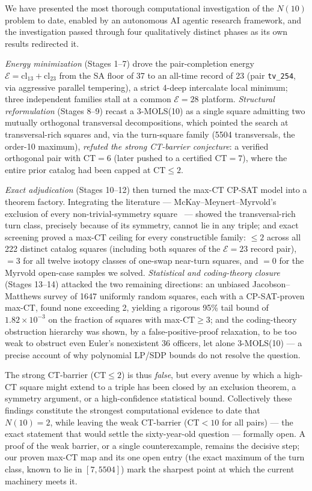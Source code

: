 \documentclass[11pt,a4paper]{article}
\theoremstyle{remark}
\newcommand{\CT}{\mathrm{CT}}
\newcommand{\cl}{\mathrm{cl}}
\newcommand{\E}{\mathcal{E}}
\begin{document}
We have presented the most thorough computational investigation of the $N(10)$
problem to date, enabled by an autonomous AI agentic research framework, and the
investigation passed through four qualitatively distinct phases as its own results
redirected it.

\emph{Energy minimization} (Stages 1--7) drove the pair-completion energy
$\E = \cl_{13} + \cl_{23}$ from the SA floor of 37 to an all-time record of 23 (pair
\texttt{tv\_254}, via aggressive parallel tempering), a strict 4-deep intercalate
local minimum; three independent families stall at a common $\E=28$ platform.
\emph{Structural reformulation} (Stages 8--9) recast a 3-MOLS(10) as a single square
admitting two mutually orthogonal transversal decompositions, which pointed the search
at transversal-rich squares and, via the turn-square family (5504 transversals, the
order-10 maximum), \emph{refuted the strong CT-barrier conjecture}: a verified
orthogonal pair with $\CT = 6$ (later pushed to a certified $\CT = 7$), where the entire
prior catalog had been capped at $\CT \leq 2$.

\emph{Exact adjudication} (Stages 10--12) then turned the max-$\CT$ CP-SAT model into a
theorem factory. Integrating the literature --- McKay--Meynert--Myrvold's exclusion of
every non-trivial-symmetry square~\cite{mmm2007} --- showed the transversal-rich turn
class, precisely because of its symmetry, cannot lie in any triple; and exact screening
proved a max-$\CT$ ceiling for every constructible family: $\leq 2$ across all 222
distinct catalog squares (including both squares of the $\E=23$ record pair), $=3$ for
all twelve isotopy classes of one-swap near-turn squares, and $=0$ for the Myrvold
open-case samples we solved. \emph{Statistical and coding-theory closure} (Stages
13--14) attacked the two remaining directions: an unbiased Jacobson--Matthews survey of
1647 uniformly random squares, each with a CP-SAT-proven max-$\CT$, found none exceeding
2, yielding a rigorous 95\% tail bound of $1.82\times10^{-3}$ on the fraction of squares
with max-$\CT \geq 3$; and the coding-theory obstruction hierarchy was shown, by a
false-positive-proof relaxation, to be too weak to obstruct even Euler's nonexistent 36
officers, let alone 3-MOLS(10) --- a precise account of why polynomial LP/SDP bounds do
not resolve the question.

The strong CT-barrier ($\CT \leq 2$) is thus \emph{false}, but every avenue by which a
high-$\CT$ square might extend to a triple has been closed by an exclusion theorem, a
symmetry argument, or a high-confidence statistical bound. Collectively these findings
constitute the strongest computational evidence to date that $N(10) = 2$, while leaving
the weak CT-barrier ($\CT < 10$ for all pairs) --- the exact statement that would settle
the sixty-year-old question --- formally open. A proof of the weak barrier, or a single
counterexample, remains the decisive step; our proven max-$\CT$ map and its one open
entry (the exact maximum of the turn class, known to lie in $[7,5504]$) mark the sharpest
point at which the current machinery meets it.
\end{document}
